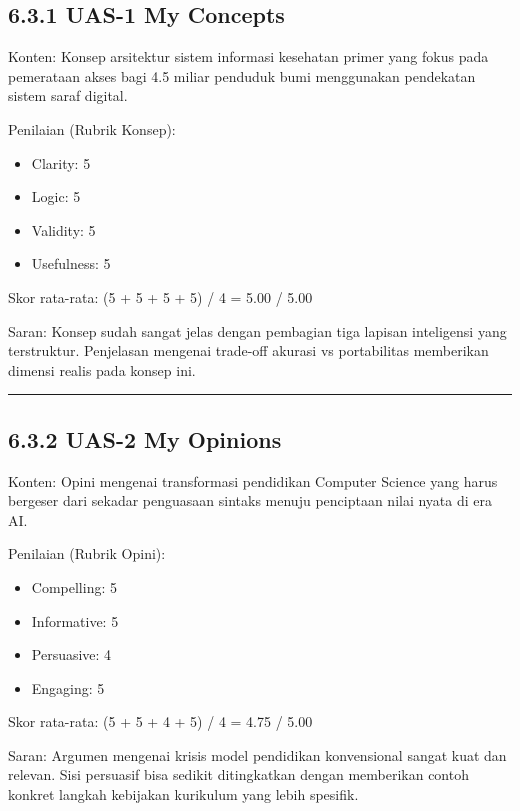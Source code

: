 \documentclass[
  letterpaper,
  DIV=11,
  numbers=noendperiod]{scrreprt}
\begin{document}
\subsection{6.3.1 UAS-1 My Concepts}\label{uas-1-my-concepts-1}

Konten: Konsep arsitektur sistem informasi kesehatan primer yang fokus
pada pemerataan akses bagi 4.5 miliar penduduk bumi menggunakan
pendekatan sistem saraf digital.

Penilaian (Rubrik Konsep):

\begin{itemize}
\item
  Clarity: 5
\item
  Logic: 5
\item
  Validity: 5
\item
  Usefulness: 5
\end{itemize}

Skor rata-rata: (5 + 5 + 5 + 5) / 4 = 5.00 / 5.00

Saran: Konsep sudah sangat jelas dengan pembagian tiga lapisan
inteligensi yang terstruktur. Penjelasan mengenai trade-off akurasi vs
portabilitas memberikan dimensi realis pada konsep ini.

\begin{center}\rule{0.5\linewidth}{0.5pt}\end{center}

\subsection{6.3.2 UAS-2 My Opinions}\label{uas-2-my-opinions-1}

Konten: Opini mengenai transformasi pendidikan Computer Science yang
harus bergeser dari sekadar penguasaan sintaks menuju penciptaan nilai
nyata di era AI.

Penilaian (Rubrik Opini):

\begin{itemize}
\item
  Compelling: 5
\item
  Informative: 5
\item
  Persuasive: 4
\item
  Engaging: 5
\end{itemize}

Skor rata-rata: (5 + 5 + 4 + 5) / 4 = 4.75 / 5.00

Saran: Argumen mengenai krisis model pendidikan konvensional sangat kuat
dan relevan. Sisi persuasif bisa sedikit ditingkatkan dengan memberikan
contoh konkret langkah kebijakan kurikulum yang lebih spesifik.
\end{document}
